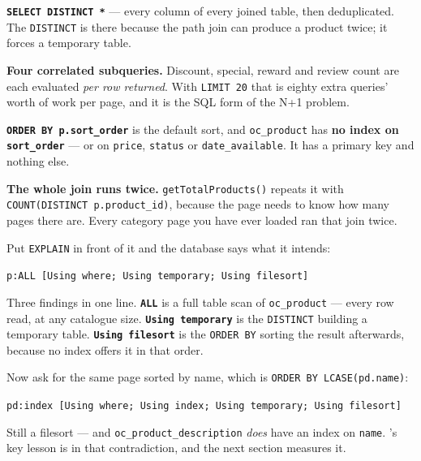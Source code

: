\begin{tightnum}
  \item \textbf{\texttt{SELECT DISTINCT *}} --- every column of every joined
        table, then deduplicated. The \texttt{DISTINCT} is there because the
        path join can produce a product twice; it forces a temporary table.
  \item \textbf{Four correlated subqueries.} Discount, special, reward and
        review count are each evaluated \emph{per row returned}. With
        \texttt{LIMIT 20} that is eighty extra queries' worth of work per page,
        and it is the SQL form of the N+1 problem.
  \item \textbf{\texttt{ORDER BY p.sort\_order}} is the default sort, and
        \texttt{oc\_product} has \textbf{no index on \texttt{sort\_order}} ---
        or on \texttt{price}, \texttt{status} or \texttt{date\_available}. It
        has a primary key and nothing else.
  \item \textbf{The whole join runs twice.} \texttt{getTotalProducts()} repeats
        it with \texttt{COUNT(DISTINCT p.product\_id)}, because the page needs
        to know how many pages there are. Every category page you have ever
        loaded ran that join twice.
\end{tightnum}

\begin{examplebox}
Put \texttt{EXPLAIN} in front of it and the database says what it intends:

\smallskip
\texttt{p:ALL [Using where; Using temporary; Using filesort]}

\smallskip
Three findings in one line. \textbf{\texttt{ALL}} is a full table scan of
\texttt{oc\_product} --- every row read, at any catalogue size.
\textbf{\texttt{Using temporary}} is the \texttt{DISTINCT} building a temporary
table. \textbf{\texttt{Using filesort}} is the \texttt{ORDER BY} sorting the
result afterwards, because no index offers it in that order.

\smallskip
Now ask for the same page sorted by name, which is \texttt{ORDER BY
LCASE(pd.name)}:

\smallskip
\texttt{pd:index [Using where; Using index; Using temporary; Using filesort]}

\smallskip
Still a filesort --- and \texttt{oc\_product\_description} \emph{does} have an
index on \texttt{name}. 's key lesson is in that
contradiction, and the next section measures it.
\end{examplebox}

